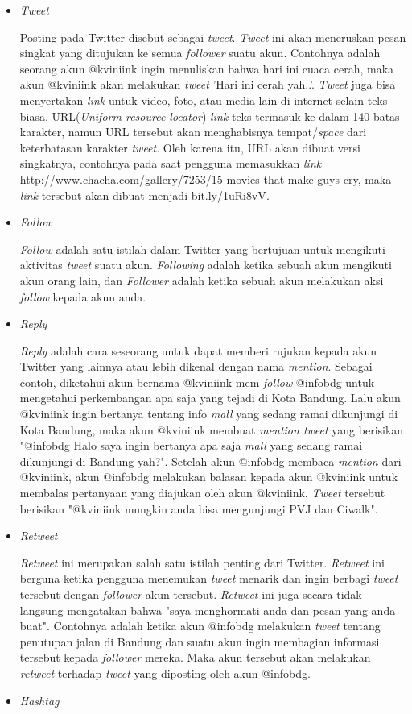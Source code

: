 \begin{itemize}
	\item \textit{Tweet} 
	
	Posting pada Twitter disebut sebagai \textit{tweet}. \textit{Tweet} ini akan meneruskan pesan singkat yang ditujukan ke semua \textit{follower} suatu akun. Contohnya adalah seorang akun @kviniink ingin menuliskan bahwa hari ini cuaca cerah, maka akun @kviniink akan melakukan \textit{tweet} 'Hari ini cerah yah..'. \textit{Tweet} juga bisa menyertakan \textit{link} untuk video, foto, atau media lain di internet selain teks biasa. URL(\textit{Uniform resource locator}) \textit{link} teks termasuk ke dalam 140 batas karakter, namun URL tersebut akan menghabisnya tempat/\textit{space} dari keterbatasan karakter \textit{tweet}. Oleh karena itu, URL akan dibuat versi singkatnya, contohnya pada saat pengguna memasukkan \textit{link} \url{http://www.chacha.com/gallery/7253/15-movies-that-make-guys-cry}, maka \textit{link} tersebut akan dibuat menjadi \url{bit.ly/1uRi8vV}. 
	\item \textit{Follow}
	
	\textit{Follow} adalah satu istilah dalam Twitter yang bertujuan untuk mengikuti aktivitas \textit{tweet} suatu akun. \textit{Following} adalah ketika sebuah akun mengikuti akun orang lain, dan \textit{Follower} adalah ketika sebuah akun melakukan aksi \textit{follow} kepada akun anda.
	\item \textit{Reply} 
	
	\textit{Reply} adalah cara seseorang untuk dapat memberi rujukan kepada akun Twitter yang lainnya atau lebih dikenal dengan nama \textit{mention}. Sebagai contoh, diketahui akun bernama @kviniink mem-\textit{follow} @infobdg untuk mengetahui perkembangan apa saja yang tejadi di Kota Bandung. Lalu akun @kviniink ingin bertanya tentang info \textit{mall} yang sedang ramai dikunjungi di Kota Bandung, maka akun @kviniink membuat \textit{mention tweet} yang berisikan "@infobdg Halo saya ingin bertanya apa saja \textit{mall} yang sedang ramai dikunjungi di Bandung yah?". Setelah akun @infobdg membaca \textit{mention} dari @kviniink, akun @infobdg melakukan balasan kepada akun @kviniink untuk membalas pertanyaan yang diajukan oleh akun @kviniink. \textit{Tweet} tersebut berisikan "@kviniink mungkin anda bisa mengunjungi PVJ dan Ciwalk".
	\item \textit{Retweet}
	
	\textit{Retweet} ini merupakan salah satu istilah penting dari Twitter. \textit{Retweet} ini berguna ketika pengguna menemukan \textit{tweet} menarik dan ingin  berbagi \textit{tweet} tersebut dengan \textit{follower} akun tersebut. \textit{Retweet} ini juga secara tidak langsung mengatakan bahwa "saya menghormati anda dan pesan yang anda buat". Contohnya adalah ketika akun @infobdg melakukan \textit{tweet} tentang penutupan jalan di Bandung dan suatu akun ingin membagian informasi tersebut kepada \textit{follower} mereka. Maka akun tersebut akan melakukan \textit{retweet} terhadap \textit{tweet} yang diposting oleh akun @infobdg.
	\item \textit{Hashtag}
	

\end{itemize}
